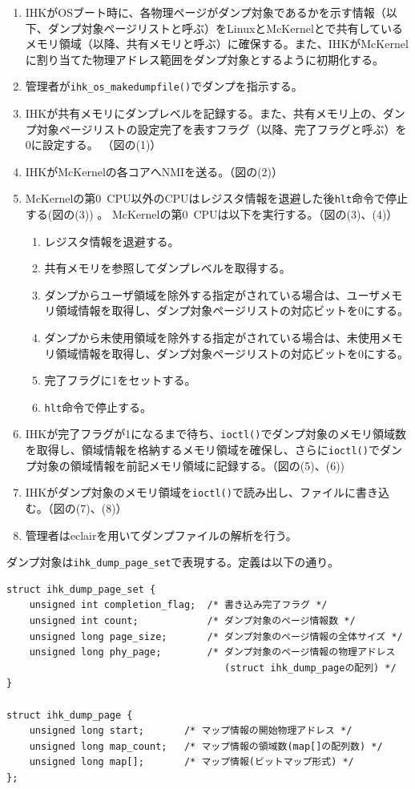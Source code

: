 \documentclass[twoside,11pt,fleqn]{book}
\begin{document}
\begin{enumerate}
\item IHKがOSブート時に、各物理ページがダンプ対象であるかを示す情報（以下、ダンプ対象ページリストと呼ぶ）をLinuxとMcKernelとで共有しているメモリ領域（以降、共有メモリと呼ぶ）に確保する。また、IHKがMcKernelに割り当てた物理アドレス範囲をダンプ対象とするように初期化する。
\item 管理者が\texttt{ihk\_os\_makedumpfile()}でダンプを指示する。
\item IHKが共有メモリにダンプレベルを記録する。また、共有メモリ上の、ダンプ対象ページリストの設定完了を表すフラグ（以降、完了フラグと呼ぶ）を0に設定する。 （図の(1)）
\item IHKがMcKernelの各コアへNMIを送る。（図の(2)）
\item McKernelの第0~CPU以外のCPUはレジスタ情報を退避した後\texttt{hlt}命令で停止する(図の(3)) 。 McKernelの第0~CPUは以下を実行する。（図の(3)、(4)） 
\begin{enumerate}
\item レジスタ情報を退避する。
\item 共有メモリを参照してダンプレベルを取得する。
\item ダンプからユーザ領域を除外する指定がされている場合は、ユーザメモリ領域情報を取得し、ダンプ対象ページリストの対応ビットを0にする。
\item ダンプから未使用領域を除外する指定がされている場合は、未使用メモリ領域情報を取得し、ダンプ対象ページリストの対応ビットを0にする。
\item 完了フラグに1をセットする。
\item \texttt{hlt}命令で停止する。
\end{enumerate}
\item IHKが完了フラグが1になるまで待ち、\texttt{ioctl()}でダンプ対象のメモリ領域数を取得し、領域情報を格納するメモリ領域を確保し、さらに\texttt{ioctl()}でダンプ対象の領域情報を前記メモリ領域に記録する。（図の(5)、(6))
\item IHKがダンプ対象のメモリ領域を\texttt{ioctl()}で読み出し、ファイルに書き込む。（図の(7)、(8)）
\item 管理者はeclairを用いてダンプファイルの解析を行う。
\end{enumerate}

ダンプ対象は\texttt{ihk\_dump\_page\_set}で表現する。定義は以下の通り。
\begin{verbatim}
struct ihk_dump_page_set {
    unsigned int completion_flag;  /* 書き込み完了フラグ */
    unsigned int count;            /* ダンプ対象のページ情報数 */
    unsigned long page_size;       /* ダンプ対象のページ情報の全体サイズ */
    unsigned long phy_page;        /* ダンプ対象のページ情報の物理アドレス
                                      (struct ihk_dump_pageの配列) */
}

struct ihk_dump_page {
    unsigned long start;       /* マップ情報の開始物理アドレス */
    unsigned long map_count;   /* マップ情報の領域数(map[]の配列数) */
    unsigned long map[];       /* マップ情報(ビットマップ形式) */
};
\end{verbatim}
\end{document}
